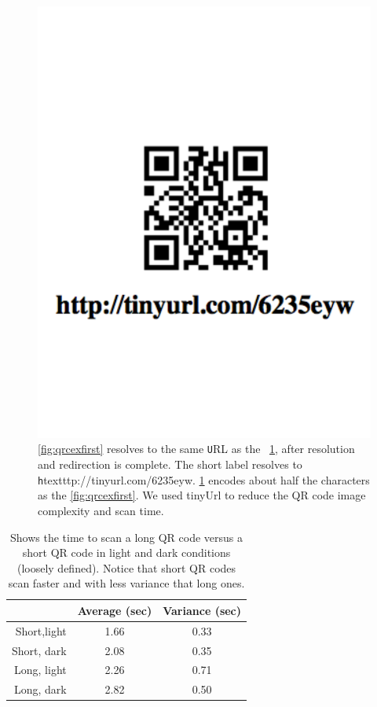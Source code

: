 \begin{figure}[h!]
\begin{center}
\includegraphics[scale=0.35]{figs/qrcex}
\caption{\ref{fig:qrcexfirst} resolves to the same {\texttt URL} as the ~\ref{fig:qrcexsecond}, after resolution and
	redirection is complete. 
	The short label resolves to {\texttt htextttp://tinyurl.com/6235eyw}.  \ref{fig:qrcexsecond} encodes about half
	the characters as the \ref{fig:qrcexfirst}.
	We used tinyUrl to reduce the QR code image complexity and scan time.}
 \label{fig:qrcexsecond}
\end{center}
\end{figure}

\begin{table}
\label{tab:qrscans}
\begin{center}
  \begin{tabular}{| r | c  c | }
    \hline
    			 & {\textbf Average (sec) } & {\textbf Variance (sec)} \\ \hline
    Short,light & 1.66 & 0.33 \\ \hline
    Short, dark & 2.08 & 0.35 \\ \hline
    Long, light & 2.26 & 0.71 \\ \hline
    Long, dark & 2.82 & 0.50 \\
    \hline
  \end{tabular}
\caption{Shows the time to scan a long QR code versus a short QR code in light and dark conditions (loosely defined).
Notice that short QR codes scan faster and with less variance that long ones.}
\end{center}

\end{table}

